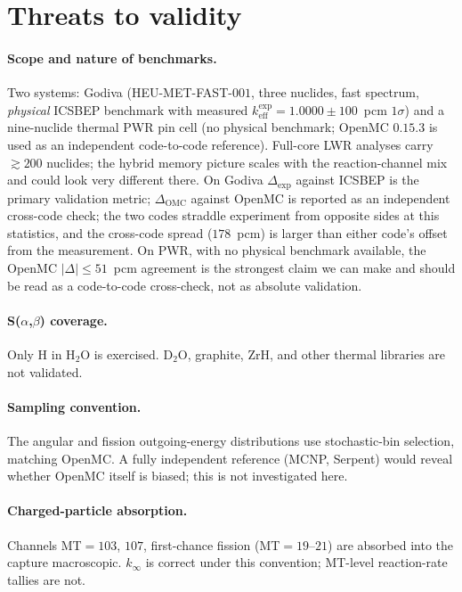 \section{Threats to validity}
\label{sec:threats}

\paragraph{Scope and nature of benchmarks.}
Two systems: Godiva (HEU-MET-FAST-$001$, three nuclides,
fast spectrum, \emph{physical} ICSBEP benchmark with measured
$k_\text{eff}^\text{exp} = 1.0000 \pm 100$~pcm $1\sigma$) and
a nine-nuclide thermal PWR pin cell (no physical benchmark;
OpenMC $0.15.3$ is used as an independent code-to-code
reference). Full-core LWR analyses carry $\gtrsim 200$
nuclides; the hybrid memory picture scales with the
reaction-channel mix and could look very different there.
On Godiva $\Delta_\text{exp}$ against ICSBEP is the
primary validation metric; $\Delta_\text{OMC}$ against
OpenMC is reported as an independent cross-code check;
the two codes straddle experiment from opposite sides at
this statistics, and the cross-code spread ($178$~pcm)
is larger than either code's offset from the measurement. On PWR,
with no physical benchmark available, the OpenMC
$|\Delta| \le 51$~pcm agreement is the strongest claim we
can make and should be read as a code-to-code cross-check,
not as absolute validation.

\paragraph{S($\alpha$,$\beta$) coverage.}
Only H in H$_2$O is exercised. D$_2$O, graphite, ZrH, and
other thermal libraries are not validated.

\paragraph{Sampling convention.}
The angular and fission outgoing-energy distributions use
stochastic-bin selection, matching OpenMC. A fully
independent reference (MCNP, Serpent) would reveal whether
OpenMC itself is biased; this is not investigated here.

\paragraph{Charged-particle absorption.}
Channels MT$=103$, $107$, first-chance fission
(MT$=19$--$21$) are absorbed into the capture macroscopic.
$k_\infty$ is correct under this convention; MT-level
reaction-rate tallies are not.

